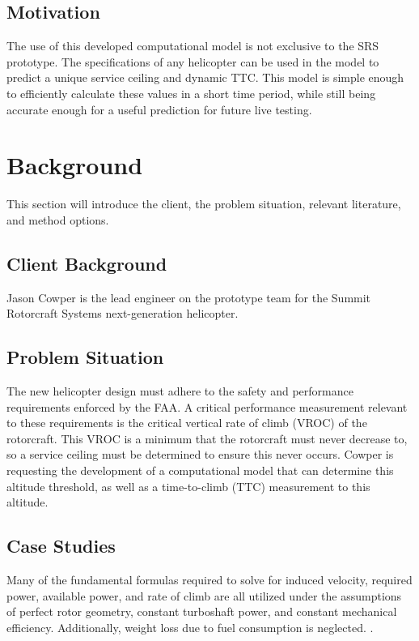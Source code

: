 \documentclass[12pt]{report}
\begin{document}
\section{Motivation}

The use of this developed computational model is not exclusive to the SRS prototype. The specifications of any helicopter can be used in the
model to predict a unique service ceiling and dynamic TTC. This model is simple enough to efficiently calculate these values in a short time
period, while still being accurate enough for a useful prediction for future live testing.

\chapter{Background} 
This section will introduce the client, the problem situation, relevant literature, and method options.

\section{Client Background}
Jason Cowper is the lead engineer on the prototype team for the Summit Rotorcraft Systems next-generation helicopter.

\section{Problem Situation}
The new helicopter design must adhere to the safety and performance requirements enforced by the FAA. A critical performance measurement
relevant to these requirements is the critical vertical rate of climb (VROC) of the rotorcraft. This VROC is a minimum that the rotorcraft
must never decrease to, so a service ceiling must be determined to ensure this never occurs. Cowper is requesting the development of a
computational model that can determine this altitude threshold, as well as a time-to-climb (TTC) measurement to this altitude.

\section{Case Studies}
Many of the fundamental formulas required to solve for induced velocity, required power, available power, and rate of climb are
all utilized under the assumptions of perfect rotor geometry, constant turboshaft power, and constant mechanical efficiency.
Additionally, weight loss due to fuel consumption is neglected. \cite{helidyn}.
\end{document}
